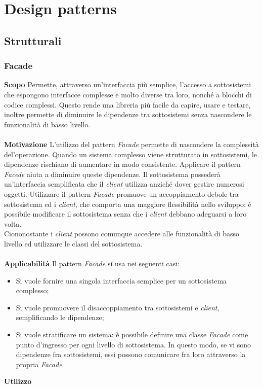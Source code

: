 \newpage
\section{Design patterns}

\subsection{Strutturali}
\subsubsection{Facade}
\textbf{Scopo}	Permette, attraverso un'interfaccia più semplice, l'accesso a sottosistemi che espongono interfacce complesse e molto diverse tra loro, nonché a blocchi di codice complessi. Questo rende una libreria più facile da capire, usare e testare, inoltre permette di diminuire le dipendenze tra sottosistemi senza nascondere le funzionalità di basso livello.
\\\\
\textbf{Motivazione}	L'utilizzo del pattern \textit{Facade} permette di nascondere la complessità del'operazione. Quando un sistema complesso viene strutturato in sottosistemi, le dipendenze rischiano di aumentare in modo consistente. Applicare il pattern \textit{Facede} aiuta a diminuire queste dipendenze. Il sottosistema possederà un'interfaccia semplificata che il \textit{client} utilizza anziché dover gestire numerosi oggetti. Utilizzare il pattern \textit{Facade} promuove un accoppiamento debole tra sottosistema ed i \textit{client}, che comporta una maggiore flessibilità nello sviluppo: è possibile modificare il sottosistema senza che i \textit{client} debbano adeguarsi a loro volta. \\
Ciononostante i \textit{client} possono comunque accedere alle funzionalità di basso livello ed utilizzare le classi del sottosistema.
\\\\
\textbf{Applicabilità}	Il pattern \textit{Facade} si usa nei seguenti casi:
	\begin{itemize}
		\item Si vuole fornire una singola interfaccia semplice per un sottosistema complesso;
		\item Si vuole promuovere il disaccoppiamento tra sottosistemi e \textit{client}, semplificando le dipendenze;
		\item Si vuole stratificare un sistema: è possibile definire una classe \textit{Facade} come punto d'ingresso per ogni livello di sottosistema. In questo modo, se vi sono dipendenze fra sottosistemi, essi possono comunicare fra loro attraverso la propria \textit{Facade}.
	\end{itemize}
\textbf{Utilizzo}

